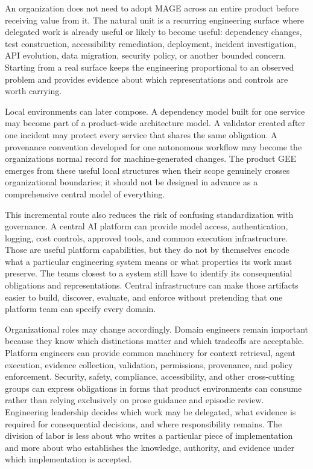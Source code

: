 

An organization does not need to adopt MAGE across an entire product before receiving value from it. The natural unit is a recurring engineering surface where delegated work is already useful or likely to become useful: dependency changes, test construction, accessibility remediation, deployment, incident investigation, API evolution, data migration, security policy, or another bounded concern. Starting from a real surface keeps the engineering proportional to an observed problem and provides evidence about which representations and controls are worth carrying.

Local environments can later compose. A dependency model built for one service may become part of a product-wide architecture model. A validator created after one incident may protect every service that shares the same obligation. A provenance convention developed for one autonomous workflow may become the organization\textquotesingle s normal record for machine-generated changes. The product GEE emerges from these useful local structures when their scope genuinely crosses organizational boundaries; it should not be designed in advance as a comprehensive central model of everything.

This incremental route also reduces the risk of confusing standardization with governance. A central AI platform can provide model access, authentication, logging, cost controls, approved tools, and common execution infrastructure. Those are useful platform capabilities, but they do not by themselves encode what a particular engineering system means or what properties its work must preserve. The teams closest to a system still have to identify its consequential obligations and representations. Central infrastructure can make those artifacts easier to build, discover, evaluate, and enforce without pretending that one platform team can specify every domain.

Organizational roles may change accordingly. Domain engineers remain important because they know which distinctions matter and which tradeoffs are acceptable. Platform engineers can provide common machinery for context retrieval, agent execution, evidence collection, validation, permissions, provenance, and policy enforcement. Security, safety, compliance, accessibility, and other cross-cutting groups can express obligations in forms that product environments can consume rather than relying exclusively on prose guidance and episodic review. Engineering leadership decides which work may be delegated, what evidence is required for consequential decisions, and where responsibility remains. The division of labor is less about who writes a particular piece of implementation and more about who establishes the knowledge, authority, and evidence under which implementation is accepted.

